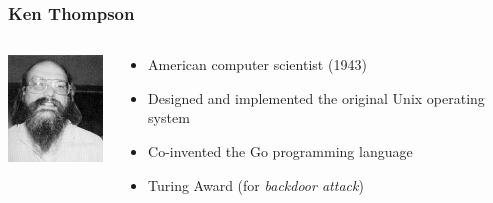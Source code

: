 \documentclass[aspectratio=169,xcolor=table]{beamer}
\begin{document}
\begin{frame}
  \frametitle{Ken Thompson}
  \begin{columns}[T]
    \begin{column}{.3\textwidth}
      \begin{center}
        \includegraphics[width=100px]{images/ken-thompson.png}
      \end{center}
    \end{column}
    \begin{column}{.7\textwidth}
      \begin{itemize}
        \item American computer scientist (1943) \pause
        \item Designed and implemented the original Unix operating
          system \pause
        \item Co-invented the Go programming language \pause
        \item Turing Award (for \textit{backdoor attack})
      \end{itemize}
    \end{column}
  \end{columns}
\end{frame}


\end{document}
